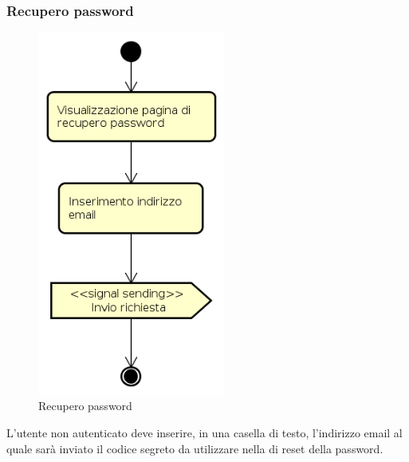 \subsubsection{Recupero password}
\begin{figure}[H]
\begin{center}
\includegraphics[height=12cm]{res/sections/backend/activities/recuperoPassword.png}
\caption{Recupero password}
\end{center}
\end{figure}
L'utente non autenticato deve inserire, in una casella di testo, l'indirizzo email al quale sarà inviato il codice segreto da utilizzare nella  di reset della password.
